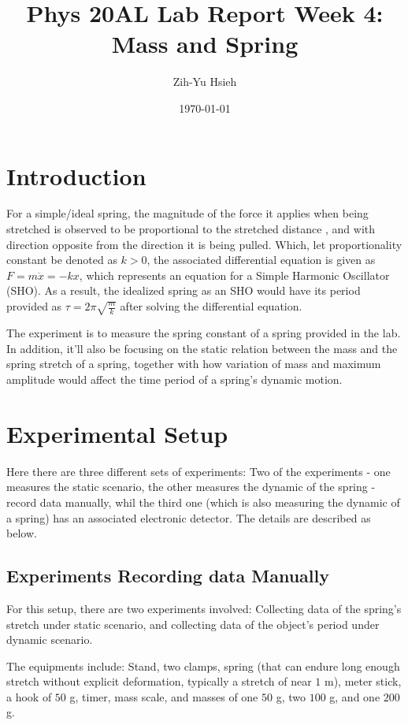 \documentclass{article}
\title{Phys 20AL Lab Report Week 4: Mass and Spring}
\author{Zih-Yu Hsieh}
\date{\today}
\begin{document}
\maketitle

\tableofcontents

\newpage

\section{Introduction}
For a simple/ideal spring, the  magnitude of the force it applies when being stretched is observed to be proportional to the stretched distance , and with direction opposite from the direction it is being pulled. Which, let proportionality constant be denoted as $k>0$, the associated differential equation is given as $F = m \ddot x = -k x$, which represents an equation for a Simple Harmonic Oscillator (SHO). As a result, the idealized spring as an SHO would have its period provided as $\tau=2\pi\sqrt{\frac{m}{k}}$ after solving the differential equation.

\hfill

The experiment is to measure the spring constant of a spring provided in the lab. In addition, it'll also be focusing on the static relation between the mass and the spring stretch of a spring, together with how variation of mass and maximum amplitude would affect the time period of a spring's dynamic motion.

\hfill

\hfill

\section{Experimental Setup}
Here there are three different sets of experiments: Two of the experiments - one measures the static scenario, the other measures the dynamic of the spring - record data manually, whil the third one (which is also measuring the dynamic of a spring) has an associated electronic detector. The details are described as below.

\subsection{Experiments Recording data Manually}
For this setup, there are two experiments involved: Collecting data of the spring's stretch under static scenario, and collecting data of the object's period under dynamic scenario.

The equipments include: Stand, two clamps, spring (that can endure long enough stretch without explicit deformation, typically a stretch of near $1$ m), meter stick, a hook of $50$ g, timer, mass scale, and masses of one $50$ g, two $100$ g, and one $200$ g.
\end{document}
